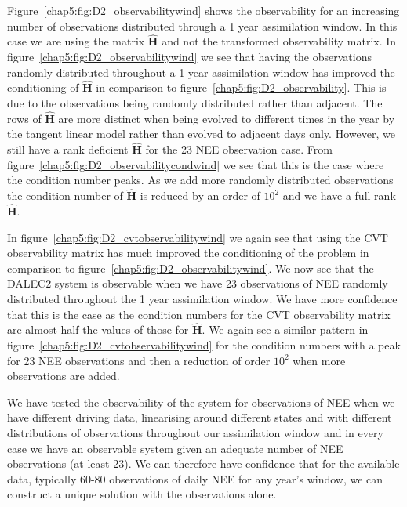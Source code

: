 Figure~\ref{chap5:fig:D2_observabilitywind} shows the observability for an increasing number of observations distributed through a 1 year assimilation window. In this case we are using the matrix $\hat{\textbf{H}}$ and not the transformed observability matrix. In figure~\ref{chap5:fig:D2_observabilitywind} we see that having the observations randomly distributed throughout a 1 year assimilation window has improved the conditioning of $\hat{\textbf{H}}$ in comparison to figure~\ref{chap5:fig:D2_observability}. This is due to the observations being randomly distributed rather than adjacent. The rows of $\hat{\textbf{H}}$ are more distinct when being evolved to different times in the year by the tangent linear model rather than evolved to adjacent days only. However, we still have a rank deficient $\hat{\textbf{H}}$ for the 23 NEE observation case. From figure~\ref{chap5:fig:D2_observabilitycondwind} we see that this is the case where the condition number peaks. As we add more randomly distributed observations the condition number of $\hat{\textbf{H}}$ is reduced by an order of $10^{2}$ and we have a full rank $\hat{\textbf{H}}$. 

In figure~\ref{chap5:fig:D2_cvtobservabilitywind} we again see that using the CVT observability matrix has much improved the conditioning of the problem in comparison to figure~\ref{chap5:fig:D2_observabilitywind}. We now see that the DALEC2 system is observable when we have 23 observations of NEE randomly distributed throughout the 1 year assimilation window. We have more confidence that this is the case as the condition numbers for the CVT observability matrix are almost half the values of those for $\hat{\textbf{H}}$. We again see a similar pattern in figure~\ref{chap5:fig:D2_cvtobservabilitywind} for the condition numbers with a peak for 23 NEE observations and then a reduction of order $10^{2}$ when more observations are added. 

We have tested the observability of the system for observations of NEE when we have different driving data, linearising around different states and with different distributions of observations throughout our assimilation window and in every case we have an observable system given an adequate number of NEE observations (at least 23). We can therefore have confidence that for the available data, typically 60-80 observations of daily NEE for any year's window, we can construct a unique solution with the observations alone.

